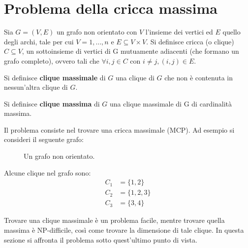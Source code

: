 
\newpage

\section{Problema della cricca massima} %
\label{sec:problema_della_cricca_massima}

Sia $G=(V,E)$ un grafo non orientato con $V$ l'insieme dei vertici ed $E$ quello degli archi, tale per cui $V={1,\dots,n}$ e $E \subseteq V \times V$. Si definisce cricca (o clique) $C \subseteq V$, un sottoinsieme di vertici di G mutuamente adiacenti (che formano un grafo completo), ovvero tali che $\forall i,j \in C$ con $i \neq j, (i,j) \in E$.

\begin{mydef}
	Si definisce \textbf{clique massimale} di $G$ una clique di $G$ che non è contenuta in nessun'altra clique di $G$.    
\end{mydef}

\begin{mydef}
	Si definisce \textbf{clique massima} di $G$ una clique massimale di G di cardinalità massima.
\end{mydef}
Il problema consiste nel trovare una cricca massimale (MCP). Ad esempio si consideri il seguente grafo:

\begin{figure}[h!]
	\centering
	\caption{Un grafo non orientato.}\label{fig:graph1}
\end{figure}
Alcune clique nel grafo sono:
\begin{align*}
	C_1 &= \{1,2\} \tag{$C_1$ non è massimale perché $C_1 \subseteq C_2$}\\
	C_2 &= \{1,2,3\} \tag{Massimale e massima}\\
	C_3 &= \{3,4\} \tag{Massimale}
\end{align*}

\newpage

Trovare una clique massimale è un problema facile, mentre trovare quella massima è NP-difficile, così come trovare la dimensione di tale clique. In questa sezione si affronta il problema sotto quest'ultimo punto di vista.

